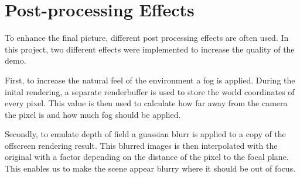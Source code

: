 \section{Post-processing Effects}
\label{cha:effects}

To enhance the final picture, different post processing effects are often used.
In this project, two different effects were implemented to increase the quality of the demo.

First, to increase the natural feel of the environment a fog is applied. During the inital rendering, a separate renderbuffer is used to store the world coordinates of every pixel. This value is then used to calculate how far away from the camera the pixel is and how much fog should be applied.

Secondly, to emulate depth of field a guassian blurr is applied to a copy of the offscreen rendering result. This blurred images is then interpolated with the original with a factor depending on the distance of the pixel to the focal plane. This enables us to make the scene appear blurry where it should be out of focus. 
